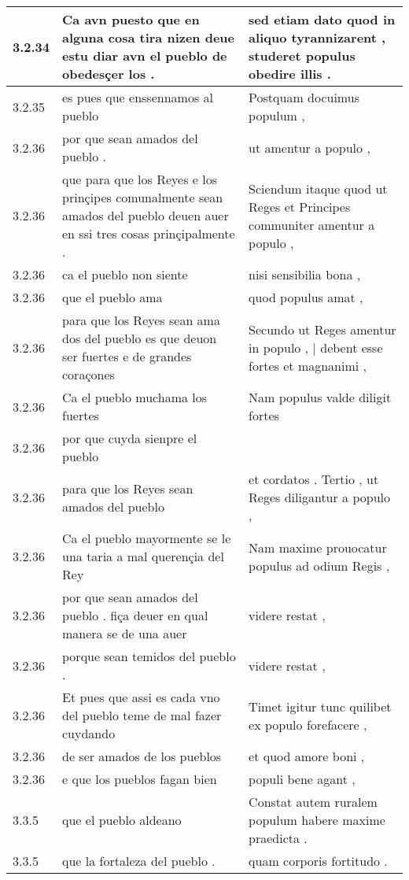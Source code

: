 \begin{tabular}{|p{1cm}|p{6.5cm}|p{6.5cm}|}
3.2.34 & Ca avn puesto que en alguna cosa tira nizen deue estu diar avn el pueblo de obedesçer los . & sed etiam dato quod in aliquo tyrannizarent , studeret populus obedire illis . \\\hline
3.2.35 & es pues que enssennamos al pueblo & Postquam docuimus populum , \\\hline
3.2.36 & por que sean amados del pueblo . & ut amentur a populo , \\\hline
3.2.36 & que para que los Reyes e los prinçipes comunalmente sean amados del pueblo deuen auer en ssi tres cosas prinçipalmente . & Sciendum itaque quod ut Reges et Principes communiter amentur a populo , \\\hline
3.2.36 & ca el pueblo non siente & nisi sensibilia bona , \\\hline
3.2.36 & que el pueblo ama & quod populus amat , \\\hline
3.2.36 & para que los Reyes sean ama dos del pueblo es que deuon ser fuertes e de grandes coraçones & Secundo ut Reges amentur in populo , | debent esse fortes et magnanimi , \\\hline
3.2.36 & Ca el pueblo muchama los fuertes & Nam populus valde diligit fortes \\\hline
3.2.36 & por que cuyda sienpre el pueblo &  \\\hline
3.2.36 & para que los Reyes sean amados del pueblo & et cordatos . Tertio , ut Reges diligantur a populo , \\\hline
3.2.36 & Ca el pueblo mayormente se le una taria a mal querençia del Rey & Nam maxime prouocatur populus ad odium Regis , \\\hline
3.2.36 & por que sean amados del pueblo . fiça deuer en qual manera se de una auer & videre restat , \\\hline
3.2.36 & porque sean temidos del pueblo . & videre restat , \\\hline
3.2.36 & Et pues que assi es cada vno del pueblo teme de mal fazer cuydando & Timet igitur tunc quilibet ex populo forefacere , \\\hline
3.2.36 & de ser amados de los pueblos & et quod amore boni , \\\hline
3.2.36 & e que los pueblos fagan bien & populi bene agant , \\\hline
3.3.5 & que el pueblo aldeano & Constat autem ruralem populum habere maxime praedicta . \\\hline
3.3.5 & que la fortaleza del pueblo . & quam corporis fortitudo . \\\hline

\end{tabular}

